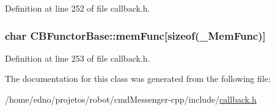 Definition at line 252 of file callback.\+h.

\hypertarget{class_c_b_functor_base_af64bc23d3a1821de1a1ab2365f98b13c}{
\subsubsection[{mem\+Func}]{\setlength{\rightskip}{0pt plus 5cm}char C\+B\+Functor\+Base\+::mem\+Func\mbox{[}sizeof({\bf \+\_\+\+Mem\+Func})\mbox{]}}}\label{class_c_b_functor_base_af64bc23d3a1821de1a1ab2365f98b13c}


Definition at line 253 of file callback.\+h.



The documentation for this class was generated from the following file\+:\begin{DoxyCompactItemize}
\item 
/home/edno/projetos/robot/cmd\+Messenger-\/cpp/include/\hyperlink{callback_8h}{callback.\+h}\end{DoxyCompactItemize}
